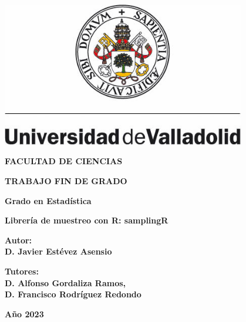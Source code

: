 \begin{titlepage}
    \centering
    \includegraphics[width=0.8\textwidth]{img/universidad-valladolid-uva.png}\par\vspace{0.5cm}
    {\Large \bfseries FACULTAD DE CIENCIAS\par}
    \vspace{2.5cm}
    {\Large \bfseries TRABAJO FIN DE GRADO\par}
    \vspace{0.5cm}
    {\Large \bfseries Grado en Estadística\par}
    \vspace{0.5cm}
    {\Large\bfseries Librería de muestreo con R: samplingR \par}
    \vspace{4cm}
    
    {\Large \bfseries Autor:\\ D. Javier Estévez Asensio\par}
    {\Large \bfseries Tutores: \\D. Alfonso Gordaliza Ramos, \\ D. Francisco Rodríguez Redondo\par}
    \vspace{0.5cm}
    {\Large \bfseries Año 2023\par}

\end{titlepage}